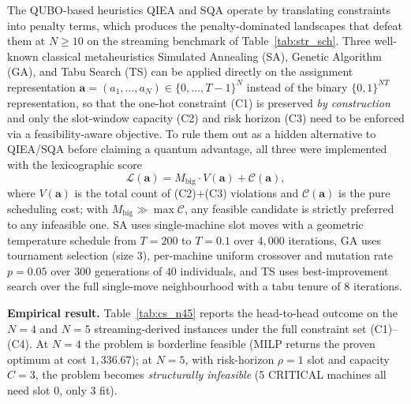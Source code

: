 The QUBO-based heuristics QIEA and SQA operate by translating constraints into penalty terms, which produces the penalty-dominated landscapes that defeat them at $N \geq 10$ on the streaming benchmark of Table~\ref{tab:str_sch}. Three well-known classical metaheuristics Simulated Annealing (SA), Genetic Algorithm (GA), and Tabu Search (TS) can be applied directly on the assignment representation $\mathbf{a} = (a_1, \ldots, a_N) \in \{0,\ldots,T-1\}^N$ instead of the binary $\{0,1\}^{NT}$ representation, so that the one-hot constraint (C1) is preserved \emph{by construction} and only the slot-window capacity (C2) and risk horizon (C3) need to be enforced via a feasibility-aware objective. To rule them out as a hidden alternative to QIEA/SQA before claiming a quantum advantage, all three were implemented with the lexicographic score
\begin{equation}
\mathcal{L}(\mathbf{a}) = M_{\text{big}} \cdot V(\mathbf{a}) + \mathcal{C}(\mathbf{a}),
\end{equation}
where $V(\mathbf{a})$ is the total count of (C2)$+$(C3) violations and $\mathcal{C}(\mathbf{a})$ is the pure scheduling cost; with $M_{\text{big}} \gg \max \mathcal{C}$, any feasible candidate is strictly preferred to any infeasible one. SA uses single-machine slot moves with a geometric temperature schedule from $T = 200$ to $T = 0.1$ over $4{,}000$ iterations, GA uses tournament selection (size $3$), per-machine uniform crossover and mutation rate $p = 0.05$ over $300$ generations of $40$ individuals, and TS uses best-improvement search over the full single-move neighbourhood with a tabu tenure of $8$ iterations.


\textbf{Empirical result.} Table~\ref{tab:cs_n45} reports the head-to-head outcome on the $N=4$ and $N=5$ streaming-derived instances under the full constraint set (C1)--(C4). At $N=4$ the problem is borderline feasible (MILP returns the proven optimum at cost $1{,}336.67$); at $N=5$, with risk-horizon $\rho = 1$ slot and capacity $C = 3$, the problem becomes \emph{structurally infeasible} (5 CRITICAL machines all need slot 0, only 3 fit).

